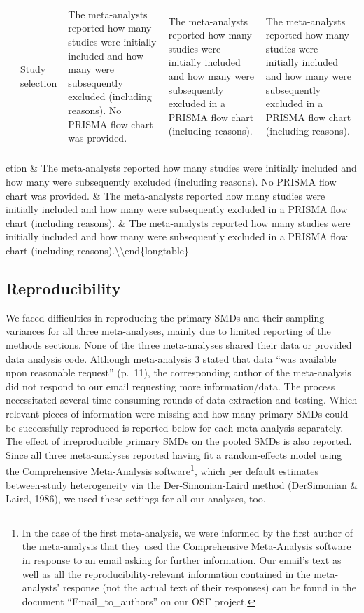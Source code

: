 \documentclass[
  man,floatsintext]{apa6}
\begin{document}
\begin{longtable}[t]{>{\raggedleft\arraybackslash}p{4em}>{\raggedright\arraybackslash}p{7em}>{\raggedright\arraybackslash}p{10em}>{\raggedright\arraybackslash}p{10em}>{\raggedright\arraybackslash}p{10em}}
17 & Study selection & The meta-analysts reported how many studies were initially included and how many were subsequently excluded (including reasons). No PRISMA flow chart was provided. & The meta-analysts reported how many studies were initially included and how many were subsequently excluded in a PRISMA flow chart (including reasons). & The meta-analysts reported how many studies were initially included and how many were subsequently excluded in a PRISMA flow chart (including reasons).\\*
\end{longtable}

ction \& The meta-analysts reported how many studies were initially included and how many were subsequently excluded (including reasons). No PRISMA flow chart was provided. \& The meta-analysts reported how many studies were initially included and how many were subsequently excluded in a PRISMA flow chart (including reasons). \& The meta-analysts reported how many studies were initially included and how many were subsequently excluded in a PRISMA flow chart (including reasons).\textbackslash*
\textbackslash end\{longtable\}
\endgroup{}
\doublespacing

\hypertarget{reproducibility-2}{%
\subsection{Reproducibility}\label{reproducibility-2}}

We faced difficulties in reproducing the primary SMDs and their sampling variances for all three meta-analyses, mainly due to limited reporting of the methods sections. None of the three meta-analyses shared their data or provided data analysis code. Although meta-analysis 3 stated that data ``was available upon reasonable request'' (p.~11), the corresponding author of the meta-analysis did not respond to our email requesting more information/data. The process necessitated several time-consuming rounds of data extraction and testing. Which relevant pieces of information were missing and how many primary SMDs could be successfully reproduced is reported below for each meta-analysis separately. The effect of irreproducible primary SMDs on the pooled SMDs is also reported. Since all three meta-analyses reported having fit a random-effects model using the Comprehensive Meta-Analysis software\footnote{In the case of the first meta-analysis, we were informed by the first author of the meta-analysis that they used the Comprehensive Meta-Analysis software in response to an email asking for further information. Our email's text as well as all the reproducibility-relevant information contained in the meta-analysts' response (not the actual text of their responses) can be found in the document ``Email\_to\_authors'' on our OSF project.}, which per default estimates between-study heterogeneity via the Der-Simonian-Laird method (DerSimonian \& Laird, 1986), we used these settings for all our analyses, too.
\end{document}
